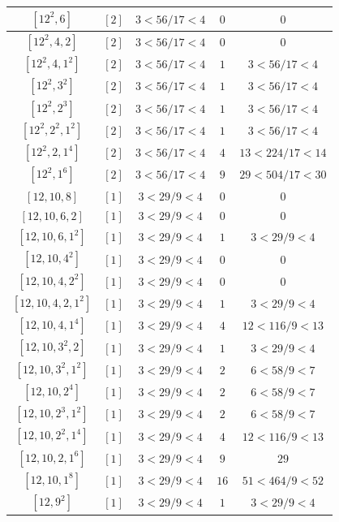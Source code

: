 \documentclass{article}%
\begin{document}
\begin{center}
\begin{longtable}{||c|c|c|c|c||}
$[12^{2}, 6]$ & $[2]$ & $3 < 56/17 < 4$ & $0$ & $0$ \\ \hline 
$[12^{2}, 4, 2]$ & $[2]$ & $3 < 56/17 < 4$ & $0$ & $0$ \\ \hline 
$[12^{2}, 4, 1^{2}]$ & $[2]$ & $3 < 56/17 < 4$ & $1$ & $3 < 56/17 < 4$ \\ \hline 
$[12^{2}, 3^{2}]$ & $[2]$ & $3 < 56/17 < 4$ & $1$ & $3 < 56/17 < 4$ \\ \hline 
$[12^{2}, 2^{3}]$ & $[2]$ & $3 < 56/17 < 4$ & $1$ & $3 < 56/17 < 4$ \\ \hline 
$[12^{2}, 2^{2}, 1^{2}]$ & $[2]$ & $3 < 56/17 < 4$ & $1$ & $3 < 56/17 < 4$ \\ \hline 
$[12^{2}, 2, 1^{4}]$ & $[2]$ & $3 < 56/17 < 4$ & $4$ & $13 < 224/17 < 14$ \\ \hline 
$[12^{2}, 1^{6}]$ & $[2]$ & $3 < 56/17 < 4$ & $9$ & $29 < 504/17 < 30$ \\ \hline 
$[12, 10, 8]$ & $[1]$ & $3 < 29/9 < 4$ & $0$ & $0$ \\ \hline 
$[12, 10, 6, 2]$ & $[1]$ & $3 < 29/9 < 4$ & $0$ & $0$ \\ \hline 
$[12, 10, 6, 1^{2}]$ & $[1]$ & $3 < 29/9 < 4$ & $1$ & $3 < 29/9 < 4$ \\ \hline 
$[12, 10, 4^{2}]$ & $[1]$ & $3 < 29/9 < 4$ & $0$ & $0$ \\ \hline 
$[12, 10, 4, 2^{2}]$ & $[1]$ & $3 < 29/9 < 4$ & $0$ & $0$ \\ \hline 
$[12, 10, 4, 2, 1^{2}]$ & $[1]$ & $3 < 29/9 < 4$ & $1$ & $3 < 29/9 < 4$ \\ \hline 
$[12, 10, 4, 1^{4}]$ & $[1]$ & $3 < 29/9 < 4$ & $4$ & $12 < 116/9 < 13$ \\ \hline 
$[12, 10, 3^{2}, 2]$ & $[1]$ & $3 < 29/9 < 4$ & $1$ & $3 < 29/9 < 4$ \\ \hline 
$[12, 10, 3^{2}, 1^{2}]$ & $[1]$ & $3 < 29/9 < 4$ & $2$ & $6 < 58/9 < 7$ \\ \hline 
$[12, 10, 2^{4}]$ & $[1]$ & $3 < 29/9 < 4$ & $2$ & $6 < 58/9 < 7$ \\ \hline 
$[12, 10, 2^{3}, 1^{2}]$ & $[1]$ & $3 < 29/9 < 4$ & $2$ & $6 < 58/9 < 7$ \\ \hline 
$[12, 10, 2^{2}, 1^{4}]$ & $[1]$ & $3 < 29/9 < 4$ & $4$ & $12 < 116/9 < 13$ \\ \hline 
$[12, 10, 2, 1^{6}]$ & $[1]$ & $3 < 29/9 < 4$ & $9$ & $29$ \\ \hline 
$[12, 10, 1^{8}]$ & $[1]$ & $3 < 29/9 < 4$ & $16$ & $51 < 464/9 < 52$ \\ \hline 
$[12, 9^{2}]$ & $[1]$ & $3 < 29/9 < 4$ & $1$ & $3 < 29/9 < 4$ \\ \hline 

\end{longtable}
\end{center}
\end{document}
